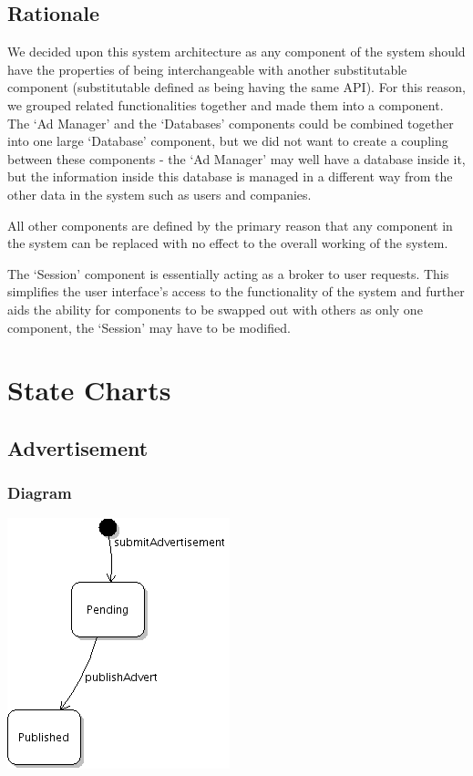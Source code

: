 \documentclass[11pt]{l3deliverable}
\begin{document}
\subsection{Rationale}

We decided upon this system architecture as any component of the system should 
have the properties of being interchangeable with another substitutable 
component (substitutable defined as being having the same API). For this reason, 
we grouped related functionalities together and made them into a component. 
The `Ad Manager' and the `Databases' components could be combined together 
into one large `Database' component, but we did not want to create a coupling 
between these components - the `Ad Manager' may well have a database inside 
it, but the information inside this database is managed in a different way from 
the other data in the system such as users and companies.

All other components are defined by the primary reason that any component in the 
system can be replaced with no effect to the overall working of the system.

The `Session' component is essentially acting as a broker to user requests. This
simplifies the user interface's access to the functionality of the system and
further aids the ability for components to be swapped out with others as only
one component, the `Session' may have to be modified.

\newpage

\section{State Charts}

\subsection{Advertisement}

\subsubsection{Diagram}

\includegraphics{advertState.png}
\end{document}
